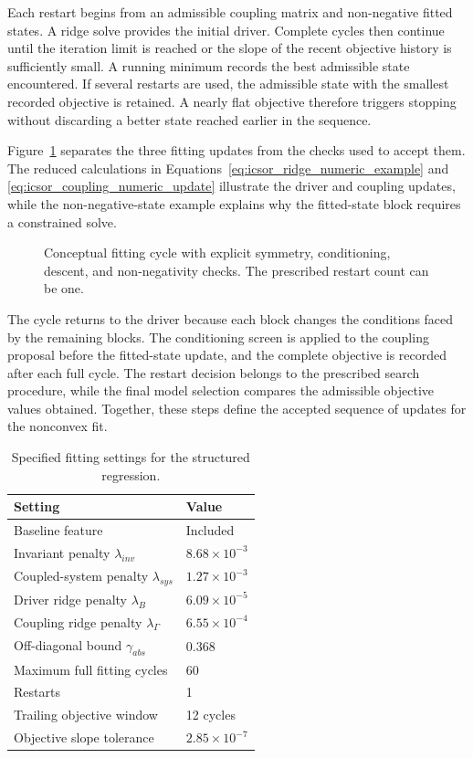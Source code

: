 Each restart begins from an admissible coupling matrix and non-negative fitted states. A ridge solve provides the initial driver. Complete cycles then continue until the iteration limit is reached or the slope of the recent objective history is sufficiently small. A running minimum records the best admissible state encountered. If several restarts are used, the admissible state with the smallest recorded objective is retained. A nearly flat objective therefore triggers stopping without discarding a better state reached earlier in the sequence.

Figure~\ref{fig:ch5_training_cycle} separates the three fitting updates from the checks used to accept them. The reduced calculations in Equations~\eqref{eq:icsor_ridge_numeric_example} and \eqref{eq:icsor_coupling_numeric_update} illustrate the driver and coupling updates, while the non-negative-state example explains why the fitted-state block requires a constrained solve.

\begin{figure}[htbp]
\centering

\caption{Conceptual fitting cycle with explicit symmetry, conditioning, descent, and non-negativity checks. The prescribed restart count can be one.}
\label{fig:ch5_training_cycle}
\end{figure}

The cycle returns to the driver because each block changes the conditions faced by the remaining blocks. The conditioning screen is applied to the coupling proposal before the fitted-state update, and the complete objective is recorded after each full cycle. The restart decision belongs to the prescribed search procedure, while the final model selection compares the admissible objective values obtained. Together, these steps define the accepted sequence of updates for the nonconvex fit.

\begin{table}[htbp]
\centering
\caption{Specified fitting settings for the structured regression.}
\label{tab:icsor_fitting_settings}
\begin{tabular}{ll}
\toprule
Setting & Value\\
\midrule
Baseline feature & Included\\
Invariant penalty \(\lambda_{inv}\) & \(8.68\times10^{-3}\)\\
Coupled-system penalty \(\lambda_{sys}\) & \(1.27\times10^{-3}\)\\
Driver ridge penalty \(\lambda_B\) & \(6.09\times10^{-5}\)\\
Coupling ridge penalty \(\lambda_{\Gamma}\) & \(6.55\times10^{-4}\)\\
Off-diagonal bound \(\gamma_{abs}\) & 0.368\\
Maximum full fitting cycles & 60\\
Restarts & 1\\
Trailing objective window & 12 cycles\\
Objective slope tolerance & \(2.85\times10^{-7}\)\\
\bottomrule
\end{tabular}
\end{table}

